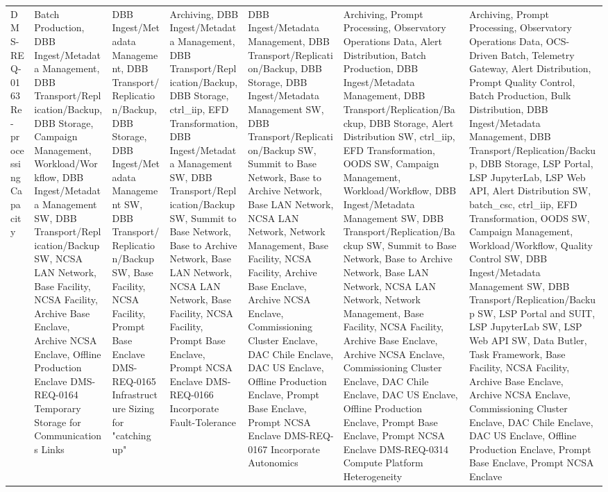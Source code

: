 \begin{xtabular}{p{0.4\textwidth}p{0.55\textwidth}}
DMS-REQ-0163 Re-processing Capacity & Batch Production, DBB Ingest/Metadata Management, DBB Transport/Replication/Backup, DBB Storage, Campaign Management, Workload/Workflow, DBB Ingest/Metadata Management SW, DBB Transport/Replication/Backup SW, NCSA LAN Network, Base Facility, NCSA Facility, Archive Base Enclave, Archive NCSA Enclave, Offline Production Enclave
DMS-REQ-0164 Temporary Storage for Communications Links & DBB Ingest/Metadata Management, DBB Transport/Replication/Backup, DBB Storage, DBB Ingest/Metadata Management SW, DBB Transport/Replication/Backup SW, Base Facility, NCSA Facility, Prompt Base Enclave
DMS-REQ-0165 Infrastructure Sizing for "catching up" & Archiving, DBB Ingest/Metadata Management, DBB Transport/Replication/Backup, DBB Storage, ctrl_iip, EFD Transformation, DBB Ingest/Metadata Management SW, DBB Transport/Replication/Backup SW, Summit to Base Network, Base to Archive Network, Base LAN Network, NCSA LAN Network, Base Facility, NCSA Facility, Prompt Base Enclave, Prompt NCSA Enclave
DMS-REQ-0166 Incorporate Fault-Tolerance & DBB Ingest/Metadata Management, DBB Transport/Replication/Backup, DBB Storage, DBB Ingest/Metadata Management SW, DBB Transport/Replication/Backup SW, Summit to Base Network, Base to Archive Network, Base LAN Network, NCSA LAN Network, Network Management, Base Facility, NCSA Facility, Archive Base Enclave, Archive NCSA Enclave, Commissioning Cluster Enclave, DAC Chile Enclave, DAC US Enclave, Offline Production Enclave, Prompt Base Enclave, Prompt NCSA Enclave
DMS-REQ-0167 Incorporate Autonomics & Archiving, Prompt Processing, Observatory Operations Data, Alert Distribution, Batch Production, DBB Ingest/Metadata Management, DBB Transport/Replication/Backup, DBB Storage, Alert Distribution SW, ctrl_iip, EFD Transformation, OODS SW, Campaign Management, Workload/Workflow, DBB Ingest/Metadata Management SW, DBB Transport/Replication/Backup SW, Summit to Base Network, Base to Archive Network, Base LAN Network, NCSA LAN Network, Network Management, Base Facility, NCSA Facility, Archive Base Enclave, Archive NCSA Enclave, Commissioning Cluster Enclave, DAC Chile Enclave, DAC US Enclave, Offline Production Enclave, Prompt Base Enclave, Prompt NCSA Enclave
DMS-REQ-0314 Compute Platform Heterogeneity & Archiving, Prompt Processing, Observatory Operations Data, OCS-Driven Batch, Telemetry Gateway, Alert Distribution, Prompt Quality Control, Batch Production, Bulk Distribution, DBB Ingest/Metadata Management, DBB Transport/Replication/Backup, DBB Storage, LSP Portal, LSP JupyterLab, LSP Web API, Alert Distribution SW, batch_csc, ctrl_iip, EFD Transformation, OODS SW, Campaign Management, Workload/Workflow, Quality Control SW, DBB Ingest/Metadata Management SW, DBB Transport/Replication/Backup SW, LSP Portal and SUIT, LSP JupyterLab SW, LSP Web API SW, Data Butler, Task Framework, Base Facility, NCSA Facility, Archive Base Enclave, Archive NCSA Enclave, Commissioning Cluster Enclave, DAC Chile Enclave, DAC US Enclave, Offline Production Enclave, Prompt Base Enclave, Prompt NCSA Enclave

\end{xtabular}
